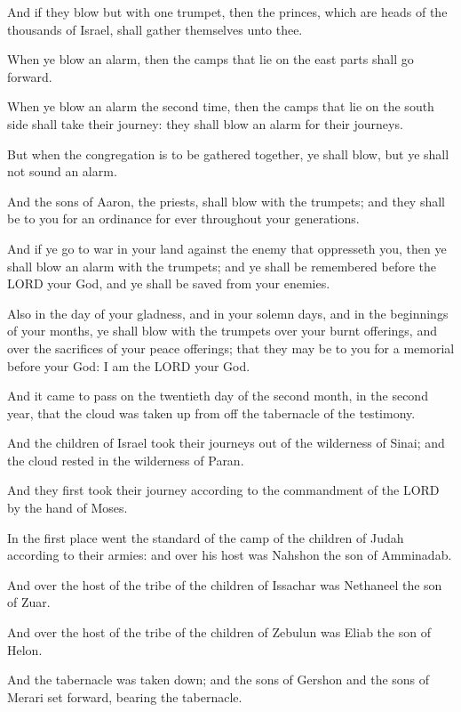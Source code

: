 \verse And if they blow but with one trumpet, then the princes, which
are heads of the thousands of Israel, shall gather themselves unto
thee.

\verse When ye blow an alarm, then the camps that lie on the east parts
shall go forward.

\verse When ye blow an alarm the second time, then the camps that lie on
the south side shall take their journey: they shall blow an alarm for
their journeys.

\verse But when the congregation is to be gathered together, ye shall
blow, but ye shall not sound an alarm.

\verse And the sons of Aaron, the priests, shall blow with the trumpets;
and they shall be to you for an ordinance for ever throughout your
generations.

\verse And if ye go to war in your land against the enemy that
oppresseth you, then ye shall blow an alarm with the trumpets; and ye
shall be remembered before the LORD your God, and ye shall be saved
from your enemies.

\verse Also in the day of your gladness, and in your solemn days, and
in the beginnings of your months, ye shall blow with the trumpets over
your burnt offerings, and over the sacrifices of your peace offerings;
that they may be to you for a memorial before your God: I am the LORD
your God.

\verse And it came to pass on the twentieth day of the second month, in
the second year, that the cloud was taken up from off the tabernacle
of the testimony.

\verse And the children of Israel took their journeys out of the
wilderness of Sinai; and the cloud rested in the wilderness of Paran.

\verse And they first took their journey according to the commandment
of the LORD by the hand of Moses.

\verse In the first place went the standard of the camp of the children
of Judah according to their armies: and over his host was Nahshon the
son of Amminadab.

\verse And over the host of the tribe of the children of Issachar was
Nethaneel the son of Zuar.

\verse And over the host of the tribe of the children of Zebulun was
Eliab the son of Helon.

\verse And the tabernacle was taken down; and the sons of Gershon and
the sons of Merari set forward, bearing the tabernacle.

